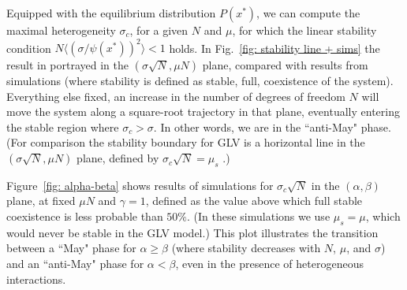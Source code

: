 Equipped with the equilibrium distribution $P(x^*)$, we can compute the maximal heterogeneity 
$\sigma_c$, for a given $N$ and $\mu$, for which the linear stability condition $N\langle (\sigma/\psi(x^*))^2\rangle < 1$ holds. In Fig.~\ref{fig: stability line + sims} the result in portrayed in the $(\sigma \sqrt{N},\mu N)$ plane,
compared with results from simulations (where stability is defined
as stable, full, coexistence of the system).
Everything else fixed, an increase in the number of
degrees of freedom $N$ will move the system along a square-root
trajectory in that plane, eventually entering the stable region where $\sigma_c > \sigma$. 
In other words, we are in the
``anti-May" phase.
(For comparison the stability boundary for GLV is a horizontal line in the $(\sigma \sqrt{N},\mu N)$ plane, defined by $\sigma_c\sqrt{N} = \mu_s$ \cite{bunin2017ecological}.)


Figure~\ref{fig: alpha-beta} shows results of simulations 
for $\sigma_c\sqrt{N}$ in the $(\alpha,\beta)$ plane, 
at fixed $\mu N$ and $\gamma = 1$, 
defined as the value above which
full stable coexistence is less probable than $50\%$.
(In these simulations we use $\mu_s = \mu$, which would never be stable in the GLV model.) This plot illustrates the transition between a ``May" phase for $\alpha \geq \beta$ (where stability decreases with $N$, $\mu$, and $\sigma$) and an ``anti-May" phase for $\alpha < \beta$, even in the presence of heterogeneous interactions. 

